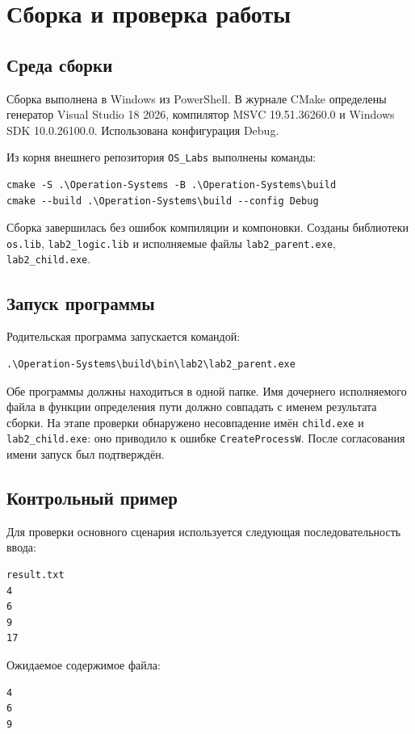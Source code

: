 \section{Сборка и проверка работы}
\subsection{Среда сборки}
Сборка выполнена в Windows из PowerShell. В журнале CMake определены генератор Visual Studio 18 2026, компилятор MSVC 19.51.36260.0 и Windows SDK 10.0.26100.0. Использована конфигурация Debug.

Из корня внешнего репозитория \texttt{OS\_Labs} выполнены команды:
\begin{verbatim}
cmake -S .\Operation-Systems -B .\Operation-Systems\build
cmake --build .\Operation-Systems\build --config Debug
\end{verbatim}

Сборка завершилась без ошибок компиляции и компоновки. Созданы библиотеки \texttt{os.lib}, \texttt{lab2\_logic.lib} и исполняемые файлы \texttt{lab2\_parent.exe}, \texttt{lab2\_child.exe}.

\subsection{Запуск программы}
Родительская программа запускается командой:
\begin{verbatim}
.\Operation-Systems\build\bin\lab2\lab2_parent.exe
\end{verbatim}

Обе программы должны находиться в одной папке. Имя дочернего исполняемого файла в функции определения пути должно совпадать с именем результата сборки. На этапе проверки обнаружено несовпадение имён \texttt{child.exe} и \texttt{lab2\_child.exe}: оно приводило к ошибке \texttt{CreateProcessW}. После согласования имени запуск был подтверждён.

\subsection{Контрольный пример}
Для проверки основного сценария используется следующая последовательность ввода:
\begin{verbatim}
result.txt
4
6
9
17
\end{verbatim}

Ожидаемое содержимое файла:
\begin{verbatim}
4
6
9
\end{verbatim}

